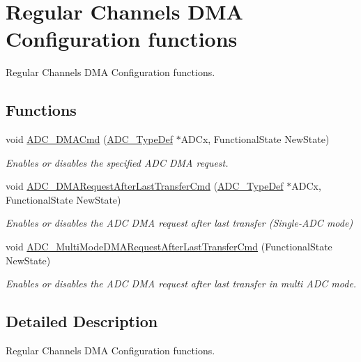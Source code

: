 \hypertarget{group___a_d_c___group5}{}\section{Regular Channels D\+M\+A Configuration functions}
\label{group___a_d_c___group5}


Regular Channels D\+M\+A Configuration functions.  


\subsection*{Functions}
\begin{DoxyCompactItemize}
\item 
void \hyperlink{group___a_d_c___group5_gac5881d5995818001584b27b137a8dbcb}{A\+D\+C\+\_\+\+D\+M\+A\+Cmd} (\hyperlink{struct_a_d_c___type_def}{A\+D\+C\+\_\+\+Type\+Def} $\ast$A\+D\+Cx, Functional\+State New\+State)
\begin{DoxyCompactList}\small\item\em Enables or disables the specified A\+D\+C D\+M\+A request. \end{DoxyCompactList}\item 
void \hyperlink{group___a_d_c___group5_ga912fd3e923ae4435621724e1bbc52729}{A\+D\+C\+\_\+\+D\+M\+A\+Request\+After\+Last\+Transfer\+Cmd} (\hyperlink{struct_a_d_c___type_def}{A\+D\+C\+\_\+\+Type\+Def} $\ast$A\+D\+Cx, Functional\+State New\+State)
\begin{DoxyCompactList}\small\item\em Enables or disables the A\+D\+C D\+M\+A request after last transfer (Single-\/\+A\+D\+C mode) \end{DoxyCompactList}\item 
void \hyperlink{group___a_d_c___group5_ga40f2be2edf2a33fc15f4a5933b562970}{A\+D\+C\+\_\+\+Multi\+Mode\+D\+M\+A\+Request\+After\+Last\+Transfer\+Cmd} (Functional\+State New\+State)
\begin{DoxyCompactList}\small\item\em Enables or disables the A\+D\+C D\+M\+A request after last transfer in multi A\+D\+C mode. \end{DoxyCompactList}\end{DoxyCompactItemize}


\subsection{Detailed Description}
Regular Channels D\+M\+A Configuration functions. 

